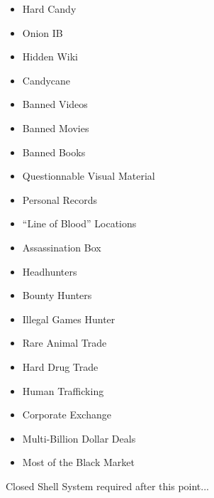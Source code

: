 \documentclass[11pt,twoside,a4paper]{book}
\begin{document}
\begin{minipage}[t]{0.45\linewidth}
	\begin{itemize}
		\setlength{\itemsep}{1pt}
		\setlength{\parskip}{0pt}
		\setlength{\parsep}{0pt}
		
		\item Hard Candy
		\item Onion IB
		\item Hidden Wiki
		\item Candycane
		\item Banned Videos
		\item Banned Movies
		\item Banned Books
		\item Questionnable Visual Material
		\item Personal Records
		\item ``Line of Blood'' Locations
	\end{itemize}
\end{minipage}
\hfill
\begin{minipage}[t]{0.45\linewidth}
	\begin{itemize}
		\setlength{\itemsep}{1pt}
		\setlength{\parskip}{0pt}
		\setlength{\parsep}{0pt}
		
		\item Assassination Box
		\item Headhunters
		\item Bounty Hunters
		\item Illegal Games Hunter
		\item Rare Animal Trade
		\item Hard Drug Trade
		\item Human Trafficking
		\item Corporate Exchange
		\item Multi-Billion Dollar Deals
		\item Most of the Black Market
	\end{itemize}
\end{minipage}

\begin{LARGE} \begin{center} Closed Shell System required after this point... \end{center} \end{LARGE}
\end{document}
